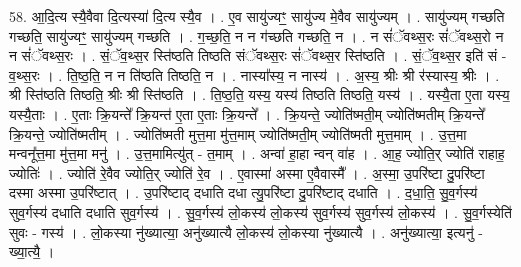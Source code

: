 \documentclass[17pt]{extarticle}
\begin{document}
58. आ॒दि॒त्य स्यै॒वैवा दि॒त्यस्या॑ दि॒त्य स्यै॒व । . ए॒व सायु॑ज्यꣳ॒॒ सायु॑ज्य मे॒वैव सायु॑ज्यम् । . सायु॑ज्यम् गच्छति गच्छति॒ सायु॑ज्यꣳ॒॒ सायु॑ज्यम् गच्छति । . ग॒च्छ॒ति॒ न न ग॑च्छति गच्छति॒ न । . न सं॑ॅवथ्स॒रः सं॑ॅवथ्स॒रो न न सं॑ॅवथ्स॒रः । . सं॒ॅव॒थ्स॒र स्ति॑ष्ठति तिष्ठति संॅवथ्स॒रः सं॑ॅवथ्स॒र स्ति॑ष्ठति । . सं॒ॅव॒थ्स॒र इति॑ सं - व॒थ्स॒रः । . ति॒ष्ठ॒ति॒ न न ति॑ष्ठति तिष्ठति॒ न । . नास्या᳚स्य॒ न नास्य॑ । . अ॒स्य॒ श्रीः श्री र॑स्यास्य॒ श्रीः । . श्री स्ति॑ष्ठति तिष्ठति॒ श्रीः श्री स्ति॑ष्ठति । . ति॒ष्ठ॒ति॒ यस्य॒ यस्य॑ तिष्ठति तिष्ठति॒ यस्य॑ । . यस्यै॒ता ए॒ता यस्य॒ यस्यै॒ताः । . ए॒ताः क्रि॒यन्ते᳚ क्रि॒यन्त॑ ए॒ता ए॒ताः क्रि॒यन्ते᳚ । . क्रि॒यन्ते॒ ज्योति॑ष्मती॒म् ज्योति॑ष्मतीम् क्रि॒यन्ते᳚ क्रि॒यन्ते॒ ज्योति॑ष्मतीम् । . ज्योति॑ष्मती मुत्त॒मा मु॑त्त॒माम् ज्योति॑ष्मती॒म् ज्योति॑ष्मती मुत्त॒माम् । . उ॒त्त॒मा मन्वनू᳚त्त॒मा मु॑त्त॒मा मनु॑ । . उ॒त्त॒मामित्यु॑त् - त॒माम् । . अन्वा॑ हा॒हा न्वन् वा॑ह । . आ॒ह॒ ज्योति॒र् ज्योति॑ राहाह॒ ज्योतिः॑ । . ज्योति॑ रे॒वैव ज्योति॒र् ज्योति॑ रे॒व । . ए॒वास्मा॑ अस्मा ए॒वैवास्मै᳚ । . अ॒स्मा॒ उ॒परि॑ष्टा दु॒परि॑ष्टा दस्मा अस्मा उ॒परि॑ष्टात् । . उ॒परि॑ष्टाद् दधाति दधा त्यु॒परि॑ष्टा दु॒परि॑ष्टाद् दधाति । . द॒धा॒ति॒ सु॒व॒र्गस्य॑ सुव॒र्गस्य॑ दधाति दधाति सुव॒र्गस्य॑ । . सु॒व॒र्गस्य॑ लो॒कस्य॑ लो॒कस्य॑ सुव॒र्गस्य॑ सुव॒र्गस्य॑ लो॒कस्य॑ । . सु॒व॒र्गस्येति॑ सुवः - गस्य॑ । . लो॒कस्या नु॑ख्यात्या॒ अनु॑ख्यात्यै लो॒कस्य॑ लो॒कस्या नु॑ख्यात्यै । . अनु॑ख्यात्या॒ इत्यनु॑ - ख्या॒त्यै॒ । \newline
\end{document}
